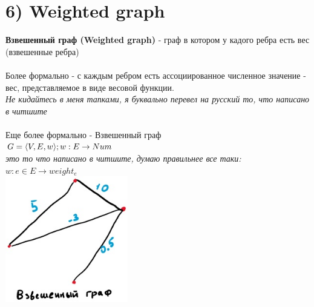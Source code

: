 \documentclass[../TM3-UltraDoc.tex]{subfiles}
\begin{document}
	\section*{6) Weighted graph}
	\textbf{Взвешенный граф (Weighted graph)} - граф в котором у кадого ребра есть вес (взвешенные ребра)\\
	\\
	Более формально - с каждым ребром есть ассоциированное численное значение - вес, представляемое в виде весовой функции.\\
	\textit{Не кидайтесь в меня тапками, я буквально перевел на русский то, что написано в читшите}\\
	\\
	Еще более формально - Взвешенный граф\\ 
	\(G = \langle V, E, w \rangle; \\ w: E \rightarrow Num\) \\
	\textit{это то что написано в читшите, думаю правильнее все таки:}\\
	\(w: e \in E \rightarrow weight_e\)\\
	\includegraphics[width = 0.4\textwidth]{6.1}
\end{document}
